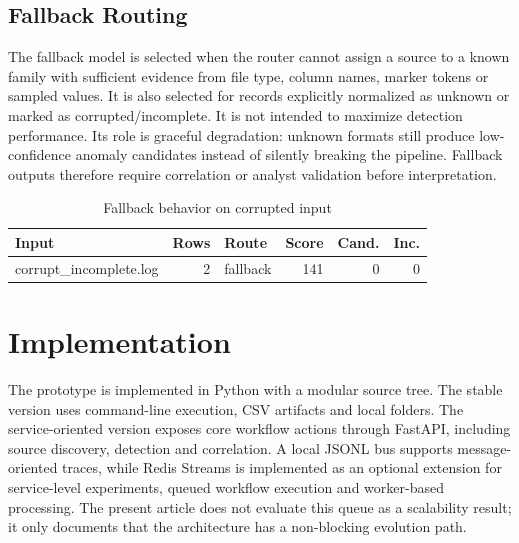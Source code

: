 \documentclass[conference]{IEEEtran}
\begin{document}
\subsection{Fallback Routing}
The fallback model is selected when the router cannot assign a source to a known family with sufficient evidence from file type, column names, marker tokens or sampled values. It is also selected for records explicitly normalized as unknown or marked as corrupted/incomplete. It is not intended to maximize detection performance. Its role is graceful degradation: unknown formats still produce low-confidence anomaly candidates instead of silently breaking the pipeline. Fallback outputs therefore require correlation or analyst validation before interpretation.

\begin{table}[t]
\caption{Fallback behavior on corrupted input}
\label{tab:fallback}
\centering
\scriptsize
\begin{tabular}{l r l r r r}
\toprule
\textbf{Input} & \textbf{Rows} & \textbf{Route} & \textbf{Score} & \textbf{Cand.} & \textbf{Inc.} \\
\midrule
corrupt\_incomplete.log & 2 & fallback & 141 & 0 & 0 \\
\bottomrule
\end{tabular}
\end{table}

\section{Implementation}
The prototype is implemented in Python with a modular source tree. The stable version uses command-line execution, CSV artifacts and local folders. The service-oriented version exposes core workflow actions through FastAPI, including source discovery, detection and correlation. A local JSONL bus supports message-oriented traces, while Redis Streams is implemented as an optional extension for service-level experiments, queued workflow execution and worker-based processing. The present article does not evaluate this queue as a scalability result; it only documents that the architecture has a non-blocking evolution path.
\end{document}
